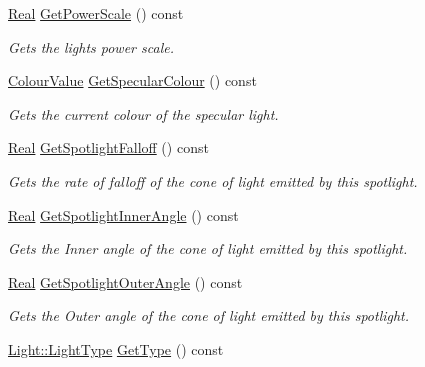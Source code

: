 \begin{DoxyCompactItemize}
\hyperlink{namespaceMezzanine_a726731b1a7df72bf3583e4a97282c6f6}{Real} \hyperlink{classMezzanine_1_1Light_a3206b96ca2e21c861e3a141464709beb}{GetPowerScale} () const 
\begin{DoxyCompactList}\small\item\em Gets the lights power scale. \item\end{DoxyCompactList}\item 
\hyperlink{classMezzanine_1_1ColourValue}{ColourValue} \hyperlink{classMezzanine_1_1Light_af3cef4b433cc3563ae3abd3675c5b922}{GetSpecularColour} () const 
\begin{DoxyCompactList}\small\item\em Gets the current colour of the specular light. \item\end{DoxyCompactList}\item 
\hyperlink{namespaceMezzanine_a726731b1a7df72bf3583e4a97282c6f6}{Real} \hyperlink{classMezzanine_1_1Light_adc25087fe48fe78c1bae8785c28d30e0}{GetSpotlightFalloff} () const 
\begin{DoxyCompactList}\small\item\em Gets the rate of falloff of the cone of light emitted by this spotlight. \item\end{DoxyCompactList}\item 
\hyperlink{namespaceMezzanine_a726731b1a7df72bf3583e4a97282c6f6}{Real} \hyperlink{classMezzanine_1_1Light_a88bb2a7515c4f67c8d367acfc1764420}{GetSpotlightInnerAngle} () const 
\begin{DoxyCompactList}\small\item\em Gets the Inner angle of the cone of light emitted by this spotlight. \item\end{DoxyCompactList}\item 
\hyperlink{namespaceMezzanine_a726731b1a7df72bf3583e4a97282c6f6}{Real} \hyperlink{classMezzanine_1_1Light_a750426a53eeed92787c996f8b35c1d32}{GetSpotlightOuterAngle} () const 
\begin{DoxyCompactList}\small\item\em Gets the Outer angle of the cone of light emitted by this spotlight. \item\end{DoxyCompactList}\item 
\hyperlink{classMezzanine_1_1Light_a783df27d8261c5af2226bc75586944be}{Light::LightType} \hyperlink{classMezzanine_1_1Light_a05cbcc2c73bf309f6b7036895bc44307}{GetType} () const 

\end{DoxyCompactItemize}
